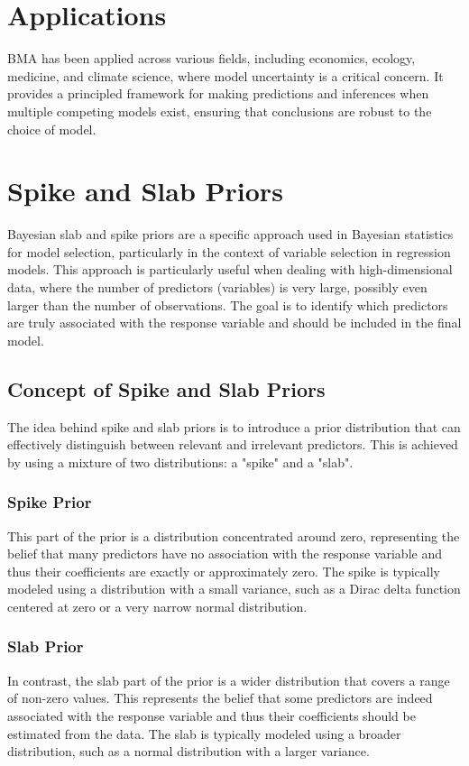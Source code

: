 \documentclass{article}
\begin{document}
\section*{Applications}

BMA has been applied across various fields, including economics, ecology, medicine, and climate science, where model uncertainty is a critical concern. It provides a principled framework for making predictions and inferences when multiple competing models exist, ensuring that conclusions are robust to the choice of model.

\section{Spike and Slab Priors}
Bayesian slab and spike priors are a specific approach used in Bayesian statistics for model selection, particularly in the context of variable selection in regression models. This approach is particularly useful when dealing with high-dimensional data, where the number of predictors (variables) is very large, possibly even larger than the number of observations. The goal is to identify which predictors are truly associated with the response variable and should be included in the final model.

\subsection{Concept of Spike and Slab Priors}

The idea behind spike and slab priors is to introduce a prior distribution that can effectively distinguish between relevant and irrelevant predictors. This is achieved by using a mixture of two distributions: a "spike" and a "slab".

\subsubsection{Spike Prior}
This part of the prior is a distribution concentrated around zero, representing the belief that many predictors have no association with the response variable and thus their coefficients are exactly or approximately zero. The spike is typically modeled using a distribution with a small variance, such as a Dirac delta function centered at zero or a very narrow normal distribution.
\subsubsection{Slab Prior}
In contrast, the slab part of the prior is a wider distribution that covers a range of non-zero values. This represents the belief that some predictors are indeed associated with the response variable and thus their coefficients should be estimated from the data. The slab is typically modeled using a broader distribution, such as a normal distribution with a larger variance.
\end{document}
